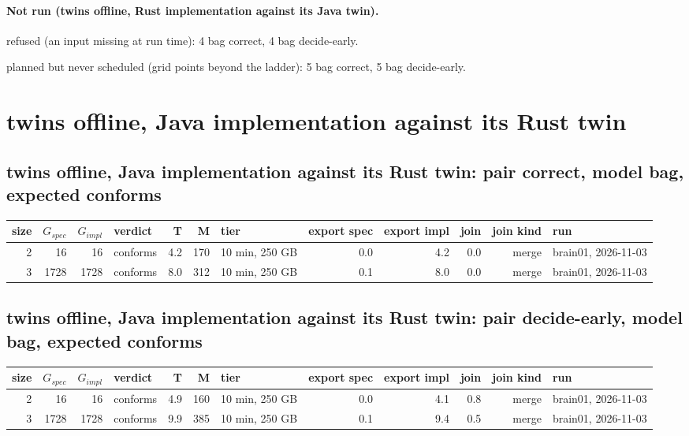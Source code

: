 \documentclass[10pt]{article}
\begin{document}
\paragraph{Not run (twins offline, Rust implementation against its Java twin).}
refused (an input missing at run time): 4 bag correct, 4 bag decide-early.\par
planned but never scheduled (grid points beyond the ladder): 5 bag correct, 5 bag decide-early.\par
\section*{twins offline, Java implementation against its Rust twin}
\subsection*{twins offline, Java implementation against its Rust twin: pair \textsf{correct}, model bag, expected conforms}
\begin{longtable}{@{}rrrlrrlrrrrl@{}}
\toprule
size & $G_{\mathit{spec}}$ & $G_{\mathit{impl}}$ & verdict & T & M & tier & export spec & export impl & join & join kind & run \\
\midrule
\endhead
\color{blue} 2 & 16 & 16 & conforms & 4.2 & 170 & 10 min, 250 GB & 0.0 & 4.2 & 0.0 & merge & brain01, 2026-11-03 \\
\color{blue} 3 & 1728 & 1728 & conforms & 8.0 & 312 & 10 min, 250 GB & 0.1 & 8.0 & 0.0 & merge & brain01, 2026-11-03 \\
\bottomrule
\end{longtable}
\subsection*{twins offline, Java implementation against its Rust twin: pair \textsf{decide-early}, model bag, expected conforms}
\begin{longtable}{@{}rrrlrrlrrrrl@{}}
\toprule
size & $G_{\mathit{spec}}$ & $G_{\mathit{impl}}$ & verdict & T & M & tier & export spec & export impl & join & join kind & run \\
\midrule
\endhead
\color{blue} 2 & 16 & 16 & conforms & 4.9 & 160 & 10 min, 250 GB & 0.0 & 4.1 & 0.8 & merge & brain01, 2026-11-03 \\
\color{blue} 3 & 1728 & 1728 & conforms & 9.9 & 385 & 10 min, 250 GB & 0.1 & 9.4 & 0.5 & merge & brain01, 2026-11-03 \\
\bottomrule
\end{longtable}
\end{document}
